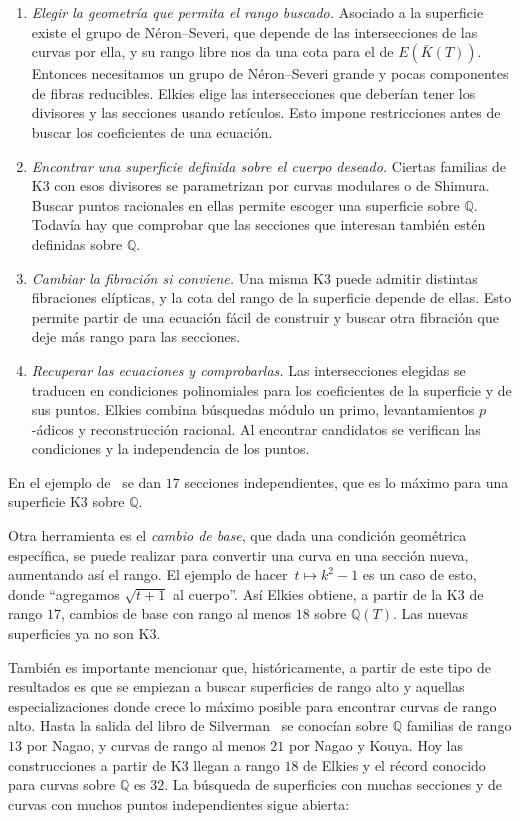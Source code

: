 \documentclass[a4paper]{book}
\theoremstyle{definition}
\theoremstyle{plain}
\newcommand{\QQ}{\mathbb{Q}}
\begin{document}
\begin{enumerate}
    \item \emph{Elegir la geometría que permita el rango buscado.} Asociado a la superficie existe el grupo de Néron--Severi, que depende de las intersecciones de las curvas por ella, y su rango libre nos da una cota para el de $E(\bar{K}(T))$. Entonces necesitamos un grupo de Néron--Severi grande y pocas componentes de fibras reducibles. Elkies elige las intersecciones que deberían tener los divisores y las secciones usando retículos. Esto impone restricciones antes de buscar los coeficientes de una ecuación.
    \item \emph{Encontrar una superficie definida sobre el cuerpo deseado.} Ciertas familias de K3 con esos divisores se parametrizan por curvas modulares o de Shimura. Buscar puntos racionales en ellas permite escoger una superficie sobre $\QQ$. Todavía hay que comprobar que las secciones que interesan también estén definidas sobre $\QQ$.
    \item \emph{Cambiar la fibración si conviene.} Una misma K3 puede admitir distintas fibraciones elípticas, y la cota del rango de la superficie depende de ellas. Esto permite partir de una ecuación fácil de construir y buscar otra fibración que deje más rango para las secciones. 
    \item \emph{Recuperar las ecuaciones y comprobarlas.} Las intersecciones elegidas se traducen en condiciones polinomiales para los coeficientes de la superficie y de sus puntos. Elkies combina búsquedas módulo un primo, levantamientos $p$-ádicos y reconstrucción racional. Al encontrar candidatos se verifican las condiciones y la independencia de los puntos.
\end{enumerate}

En el ejemplo de~\cite{Elkies2026K3Rank17} se dan $17$ secciones independientes, que es lo máximo para una superficie K3 sobre $\QQ$. 

Otra herramienta es el \emph{cambio de base}, que dada una condición geométrica específica, se puede realizar para convertir una curva en una sección nueva, aumentando así el rango. El ejemplo de hacer~$t\mapsto k^2-1$ es un caso de esto, donde ``agregamos $\sqrt{t+1}$ al cuerpo''. Así Elkies obtiene, a partir de la K3 de rango $17$, cambios de base con rango al menos $18$ sobre $\QQ(T)$. Las nuevas superficies ya no son K3.

También es importante mencionar que, históricamente, a partir de este tipo de resultados es que se empiezan a buscar superficies de rango alto y aquellas especializaciones donde crece lo máximo posible para encontrar curvas de rango alto. Hasta la salida del libro de Silverman~\cite{SilvermanAdvanced} se conocían sobre $\QQ$ familias de rango $13$ por Nagao, y curvas de rango al menos $21$ por Nagao y Kouya. Hoy las construcciones a partir de K3 llegan a rango $18$ de Elkies y el récord conocido para curvas sobre $\QQ$ es $32$. La búsqueda de superficies con muchas secciones y de curvas con muchos puntos independientes sigue abierta:
\end{document}
